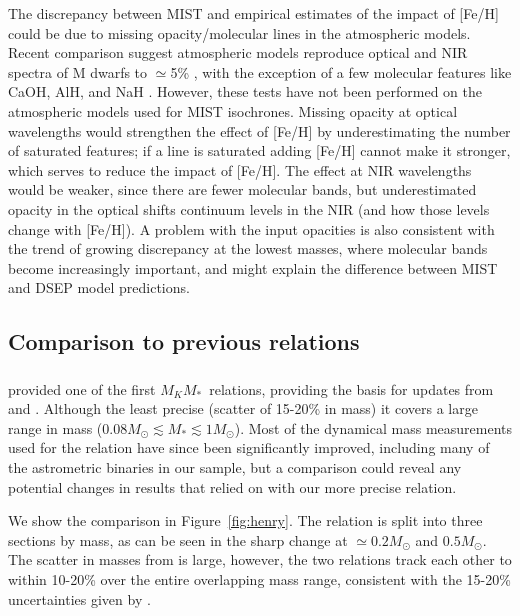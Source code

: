 \documentclass[twocolumn]{aastex62}
\newcommand{\mmkc}{$M_{K}$\textendash$M_*$}
\begin{document}
 The discrepancy between MIST and empirical estimates of the impact of [Fe/H] could be due to missing opacity/molecular lines in the atmospheric models. Recent comparison suggest atmospheric models reproduce optical and NIR spectra of M dwarfs to $\simeq$5\% \citep[e.g.,][]{Lepine:2013,Mann2013c}, with the exception of a few molecular features like CaOH, AlH, and NaH \citep{Rajpurohit:2013}. However, these tests have not been performed on the atmospheric models used for MIST isochrones. Missing opacity at optical wavelengths would strengthen the effect of [Fe/H] by underestimating the number of saturated features; if a line is saturated adding [Fe/H] cannot make it stronger, which serves to reduce the impact of [Fe/H]. The effect at NIR wavelengths would be weaker, since there are fewer molecular bands, but underestimated opacity in the optical shifts continuum levels in the NIR (and how those levels change with [Fe/H]). A problem with the input opacities is also consistent with the trend of growing discrepancy at the lowest masses, where molecular bands become increasingly important, and might explain the difference between MIST and DSEP model predictions. 
 
\subsection{Comparison to previous relations}\label{sec:other}

\subsubsection{\citet{Hen1993}}

\citet{Hen1993} provided one of the first \mmkc\ relations, providing the basis for updates from \citet{Delfosse2000} and \citet{Benedict2016}. Although the least precise (scatter of 15-20\% in mass) it covers a large range in mass ($0.08M_\odot \lesssim M_* \lesssim 1M_\odot$). Most of the dynamical mass measurements used for the \citet{Hen1993} relation have since been significantly improved, including many of the astrometric binaries in our sample, but a comparison could reveal any potential changes in results that relied on \citet{Hen1993} with our more precise relation.

We show the comparison in Figure~\ref{fig:henry}. The \citet{Hen1993} relation is split into three sections by mass, as can be seen in the sharp change at $\simeq0.2M_\odot$ and $0.5M_\odot$. The scatter in masses from \citet{Hen1993} is large, however, the two relations track each other to within 10-20\% over the entire overlapping mass range, consistent with the 15-20\% uncertainties given by \citet{Hen1993}.
\end{document}
